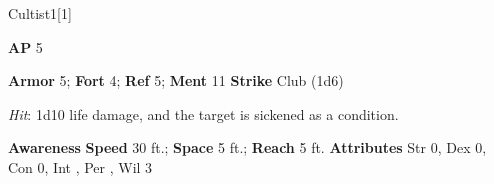 \begin{monsection}{Cultist}{1}[1]
\vspace{-1em}\vspace{-1em}
\begin{spellcontent}
\begin{spelltargetinginfo}
{\textbf{AP} 5}

\pari \textbf{Armor} 5;
\textbf{Fort} 4;
\textbf{Ref} 5;
\textbf{Ment} 11
\pari \textbf{Strike} Club  (1d6)



\end{spelltargetinginfo}


\begin{spelleffects}

\pari

\par


\par \textit{Hit}: 1d10 life damage, and the target is sickened as a condition.


\end{spelleffects}

\end{spellcontent}

\begin{monsterfooter}
\pari \textbf{Awareness} 
\pari \textbf{Speed} 30 ft.;
\textbf{Space} 5 ft.;
\textbf{Reach} 5 ft.
\pari \textbf{Attributes}
Str 0,
Dex 0,
Con 0,
Int ,
Per ,
Wil 3
\end{monsterfooter}
\end{monsection}



